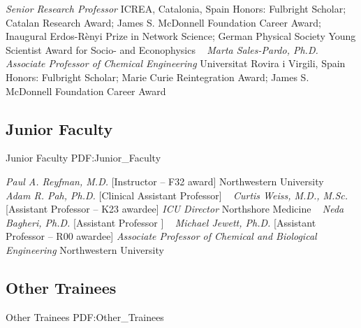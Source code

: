     \textit{Senior Research Professor}
    \newline
    ICREA, Catalonia, Spain
    \newline
    {\footnotesize Honors: Fulbright Scholar; Catalan Research Award; James S. McDonnell Foundation Career Award;  Inaugural Erdos-R\`enyi Prize in Network Science; German Physical Society Young Scientist Award for Socio- and Econophysics}
    \newline
~
\Gap{}
\textit{Marta Sales-Pardo, Ph.D.}
\newline
    \textit{Associate Professor of Chemical Engineering}
    \newline
    Universitat Rovira i Virgili, Spain
    \newline
    {\footnotesize Honors: Fulbright Scholar; Marie Curie Reintegration Award; James S. McDonnell Foundation Career Award}
    \newline
~
\Gap\vspace*{0.2cm}\subsection
{Junior Faculty}
{Junior Faculty}
{PDF:Junior_Faculty}

\GapNoBreak
{}
\textit{Paul A. Reyfman, M.D.}
    [Instructor -- F32 award]
\newline
    Northwestern University
    \newline
~
\Gap{}
\textit{Adam R. Pah, Ph.D.}
    [Clinical Assistant Professor]
\newline
~
\Gap{}
\textit{Curtis Weiss, M.D., M.Sc.}
    [Assistant Professor -- K23 awardee]
\newline
    \textit{ICU Director}
    \newline
    Northshore Medicine
    \newline
~
\Gap{}
\textit{Neda Bagheri, Ph.D.}
    [Assistant Professor ]
\newline
~
\Gap{}
\textit{Michael Jewett, Ph.D.}
    [Assistant Professor -- R00 awardee]
\newline
    \textit{Associate Professor of Chemical and Biological Engineering}
    \newline
    Northwestern University
    \newline
~
\Gap\vspace*{0.2cm}\subsection
{Other Trainees}
{Other Trainees}
{PDF:Other_Trainees}

